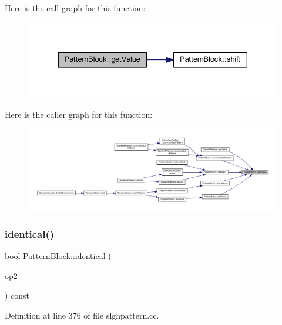 Here is the call graph for this function\+:
\nopagebreak
\begin{figure}[H]
\begin{center}
\leavevmode
\includegraphics[width=330pt]{class_pattern_block_ae890f0389a7467fedaf982a27fbb84c9_cgraph}
\end{center}
\end{figure}
Here is the caller graph for this function\+:
\nopagebreak
\begin{figure}[H]
\begin{center}
\leavevmode
\includegraphics[width=350pt]{class_pattern_block_ae890f0389a7467fedaf982a27fbb84c9_icgraph}
\end{center}
\end{figure}
\mbox{\label{class_pattern_block_aeeb525d6c26f61b7717a7b6c0092ae67}} 
\subsubsection{\texorpdfstring{identical()}{identical()}}
{\footnotesize\ttfamily bool Pattern\+Block\+::identical (\begin{DoxyParamCaption}\item[{const \mbox{\hyperlink{class_pattern_block}{Pattern\+Block}} $\ast$}]{op2 }\end{DoxyParamCaption}) const}



Definition at line 376 of file slghpattern.\+cc.

